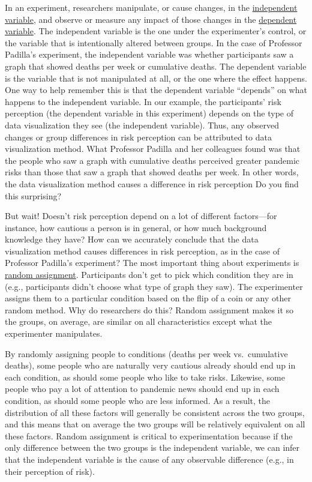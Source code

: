 \documentclass[
]{krantz}
\begin{document}
In an experiment, researchers manipulate, or cause changes, in the \hyperref[independent-variable]{independent variable}, and observe or measure any impact of those changes in the \hyperref[dependent-variable]{dependent variable}. The independent variable is the one under the experimenter's control, or the variable that is intentionally altered between groups. In the case of Professor Padilla's experiment, the independent variable was whether participants saw a graph that showed deaths per week or cumulative deaths. The dependent variable is the variable that is not manipulated at all, or the one where the effect happens. One way to help remember this is that the dependent variable ``depends'' on what happens to the independent variable. In our example, the participants' risk perception (the dependent variable in this experiment) depends on the type of data visualization they see (the independent variable). Thus, any observed changes or group differences in risk perception can be attributed to data visualization method. What Professor Padilla and her colleagues found was that the people who saw a graph with cumulative deaths perceived greater pandemic risks than those that saw a graph that showed deaths per week. In other words, the data visualization method causes a difference in risk perception Do you find this surprising?

But wait! Doesn't risk perception depend on a lot of different factors---for instance, how cautious a person is in general, or how much background knowledge they have? How can we accurately conclude that the data visualization method causes differences in risk perception, as in the case of Professor Padilla's experiment? The most important thing about experiments is \hyperref[random-assignment]{random assignment}. Participants don't get to pick which condition they are in (e.g., participants didn't choose what type of graph they saw). The experimenter assigns them to a particular condition based on the flip of a coin or any other random method. Why do researchers do this? Random assignment makes it so the groups, on average, are similar on all characteristics except what the experimenter manipulates.

By randomly assigning people to conditions (deaths per week vs.~cumulative deaths), some people who are naturally very cautious already should end up in each condition, as should some people who like to take risks. Likewise, some people who pay a lot of attention to pandemic news should end up in each condition, as should some people who are less informed. As a result, the distribution of all these factors will generally be consistent across the two groups, and this means that on average the two groups will be relatively equivalent on all these factors. Random assignment is critical to experimentation because if the only difference between the two groups is the independent variable, we can infer that the independent variable is the cause of any observable difference (e.g., in their perception of risk).
\end{document}
